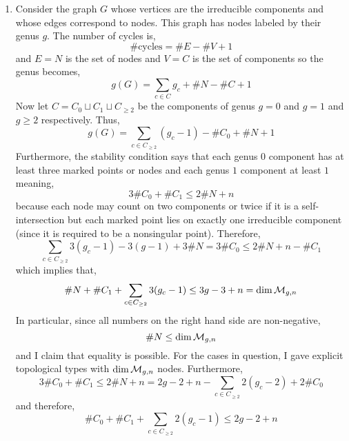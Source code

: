 \documentclass[12pt]{article}
\begin{document}
\begin{enumerate}
\item Consider the graph $G$ whose vertices are the irreducible components and whose edges correspond to nodes. This graph has nodes labeled by their genus $g$. The number of cycles is,
\[ \# \text{cycles} = \# E - \# V + 1 \]
and $E = N$ is the set of nodes and $V = C$ is the set of components so the genus becomes,
\[ g(G) = \sum_{c \in C} g_c + \# N - \# C + 1 \]
Now let $C = C_0 \sqcup C_1 \sqcup C_{\ge 2}$ be the components of genus $g = 0$ and $g = 1$ and $g \ge 2$ respectively. Thus,
\[ g(G) = \sum_{c \in C_{\ge 2}} (g_c - 1) - \# C_0 + \# N + 1 \]
Furthermore, the stability condition says that each genus $0$ component has at least three marked points or nodes and each genus $1$ component at least $1$ meaning,
\[ 3 \# C_0 + \# C_1 \le 2 \# N + n \]
because each node may count on two components or twice if it is a self-intersection but each marked point lies on exactly one irreducible component (since it is required to be a nonsingular point). Therefore,
\[ \sum_{c \in C_{\ge 2}} 3 (g_c - 1) - 3 (g - 1) + 3 \# N = 3 \# C_0 \le 2 \# N + n - \# C_1 \]
which implies that,
\[ \# N + \# C_1 + \sum_{c \in C_{\ge 2}} 3(g_c - 1) \le 3 g - 3 + n = \dim{\mathcal{M}_{g,n}} \]
In particular, since all numbers on the right hand side are non-negative,
\[ \# N \le \dim{\mathcal{M}_{g,n}} \]
and I claim that equality is possible. For the cases in question, I gave explicit topological types with $\dim{\mathcal{M}_{g,n}}$ nodes. Furthermore, 
\[ 3 \# C_0 + \# C_1 \le 2 \# N + n = 2 g - 2 + n - \sum_{c \in C_{\ge 2}} 2(g_c - 2) + 2 \# C_0 \]
and therefore,
\[ \# C_0 + \# C_1 + \sum_{c \in C_{\ge 2}} 2 (g_c - 1) \le 2g - 2 + n \]
\end{enumerate}
\end{document}
